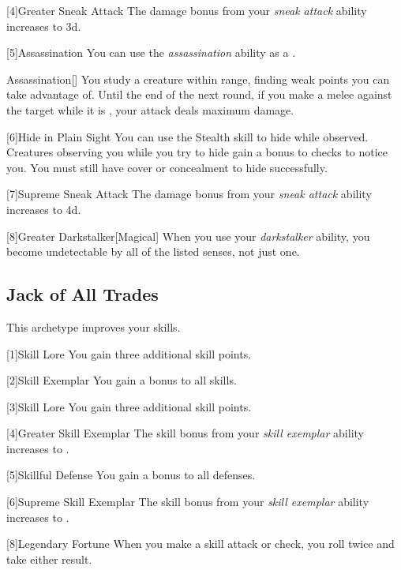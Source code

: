         [4]{Greater Sneak Attack} The damage bonus from your \textit{sneak attack} ability increases to \plus3d.

        [5]{Assassination} You can use the \textit{assassination} ability as a .
        \begin{freeability}{Assassination}[]
            You study a creature within \rngmed range, finding weak points you can take advantage of.
            Until the end of the next round, if you make a melee  against the target while it is \unaware, your attack deals maximum damage.
        \end{freeability}

        [6]{Hide in Plain Sight} You can use the Stealth skill to hide while observed.
        Creatures observing you while you try to hide gain a  bonus to checks to notice you.
        You must still have cover or concealment to hide successfully.

        [7]{Supreme Sneak Attack} The damage bonus from your \textit{sneak attack} ability increases to \plus4d.

        [8]{Greater Darkstalker}[Magical] When you use your \textit{darkstalker} ability, you become undetectable by all of the listed senses, not just one.

    \subsection{Jack of All Trades}
        This archetype improves your skills.

        [1]{Skill Lore} You gain three additional skill points.

        [2]{Skill Exemplar} You gain a  bonus to all skills.

        [3]{Skill Lore} You gain three additional skill points.

        [4]{Greater Skill Exemplar} The skill bonus from your \textit{skill exemplar} ability increases to .

        [5]{Skillful Defense} You gain a  bonus to all defenses.

        [6]{Supreme Skill Exemplar} The skill bonus from your \textit{skill exemplar} ability increases to .

        [8]{Legendary Fortune} When you make a skill attack or check, you roll twice and take either result.


